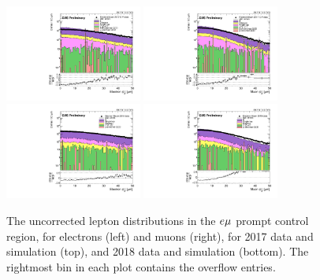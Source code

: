 \begin{figure}
\centering
\includegraphics[width=0.4\textwidth]{figures/corrections/d0_smearing/emu_2017/electronAbsD0_50um_uncorrected.pdf} 
\includegraphics[width=0.4\textwidth]{figures/corrections/d0_smearing/emu_2017/muonAbsD0_50um_uncorrected.pdf}
\includegraphics[width=0.4\textwidth]{figures/corrections/d0_smearing/emu_2018/electronAbsD0_50um_uncorrected.pdf} 
\includegraphics[width=0.4\textwidth]{figures/corrections/d0_smearing/emu_2018/muonAbsD0_50um_uncorrected.pdf}
\caption{The uncorrected lepton \ad distributions in the $e{\mu}$ prompt control region, for electrons (left) and muons (right), for 2017 data and simulation (top), and 2018 data and simulation (bottom). The rightmost bin in each plot
contains the overflow entries.}
\label{uncorrected_d0}
\end{figure}